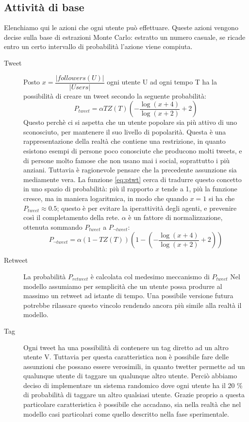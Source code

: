 \documentclass[a4paper,12pt]{article}
\begin{document}
\subsection{Attivit\`a di base}
\label{subsec:prob}

Elenchiamo qui le azioni che ogni utente può effettuare. Queste azioni vengono decise sulla base di estrazioni Monte Carlo: estratto un numero casuale, se ricade entro un certo intervallo di probabilità l'azione viene compiuta.

\begin{description}
  \item[Tweet] Posto $x = \dfrac{|followers(U)|}{|Users|}$ ogni utente U ad ogni tempo T ha la possibilit\`a
  di creare un tweet secondo la seguente probabilit\`a:
    \begin{equation}
    \label{eq:ptwt}
      P_{tweet} = \alpha TZ(T) (-\dfrac{\log{(x+4)}}{  \log{(x+2)}} +2)
    \end{equation}
  Questo perch\`e ci si aspetta che un utente popolare sia pi\`u 
  attivo di uno sconosciuto, per mantenere il suo livello di 
  popolarit\`a. Questa \`e una rappresentazione della realt\`a che contiene una restrizione, in quanto esistono esempi di persone poco conosciute che producono molti tweets, e di persone molto famose che non usano mai i social, soprattutto i pi\`u anziani. Tuttavia \`e ragionevole pensare che la precedente assunzione sia mediamente vera. La funzione \ref{eq:ptwt} cerca di tradurre questo concetto in uno spazio di probabilità: più il rapporto $x$ tende a 1, più la funzione cresce, ma in maniera logaritmica, in modo che quando $x = 1$ si ha che $P_{tweet} \approx 0.5 $; questo è per evitare la  iperattività degli agenti, e prevenire così il completamento della rete. $\alpha$ è un fattore di normalizzazione, ottenuta sommando $P_{tweet}$ a $  P_{\neg tweet}$:
  \begin{equation}
    \label{eq:ptwt}
      P_{\neg tweet} = \alpha (1 - TZ(T)) (1 - (-\dfrac{\log{(x+4)}}{  \log{(x+2)}} +2))
    \end{equation}
  
  \item[Retweet] La probabilità $P_{retweet}$ è calcolata col medesimo meccanismo di $P_{tweet}$
    Nel modello assumiamo per semplicit\`a che un utente possa produrre al massimo un retweet ad istante di tempo. Una possibile versione futura potrebbe rilassare questo vincolo rendendo ancora pi\`u simile alla realt\`a il modello.
    
  \item[Tag] Ogni tweet ha una possibilit\`a di contenere un tag 
  diretto ad un altro utente V. Tuttavia per questa caratteristica non \`e possibile fare delle assunzioni che possano essere verosimili, in quanto twetter permette ad un qualunque utente di taggare un qualunque altro utente. Perci\`o abbiamo deciso di implementare un sistema randomico dove ogni utente ha il 20 \% di probabilit\`a di taggare un altro qualsiasi utente. 
  Grazie proprio a questa particolare caratteristica \`e possibile che accadano, sia nella realt\`a che nel modello casi particolari come quello descritto nella fase sperimentale.
\end{description}
\end{document}
